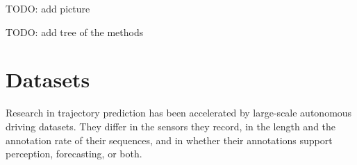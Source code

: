 TODO: add picture

TODO: add tree of the methods 



\section{Datasets}
\label{sec:sota-datasets}

Research in trajectory prediction has been accelerated by large-scale autonomous driving datasets. They
differ in the sensors they record, in the length and the annotation rate of their sequences, and in whether
their annotations support perception, forecasting, or both.

